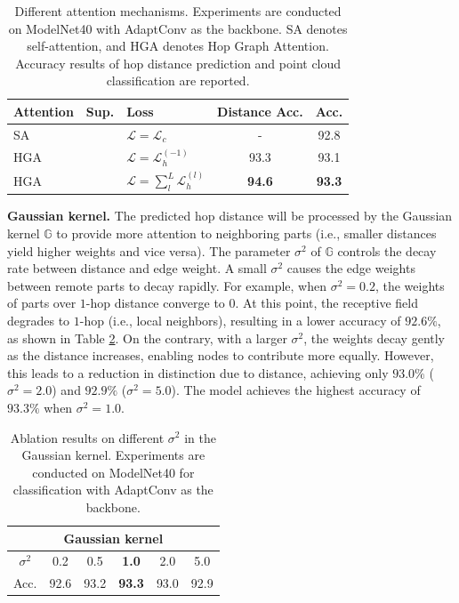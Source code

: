 \documentclass[letterpaper]{article}
\newcommand{\cmark}{\ding{51}}
\newcommand{\xmark}{\ding{55}}
\begin{document}
\setlength{\tabcolsep}{4pt}
\begin{table}
\begin{center}
\begin{tabular}{l c l c c}
\hline
Attention & Sup. & Loss & Distance Acc. & Acc.\\
\hline
SA & \cmark & $\mathcal{L} = \mathcal{L}_c $ & - & 92.8\\
HGA & \xmark & $\mathcal{L} = \mathcal{L}_h^{(-1)}$ & 93.3 & 93.1\\
HGA & \xmark & $\mathcal{L} = \sum_{l}^{L}\mathcal{L}_h^{(l)}$ & \bf{94.6} & \bf{93.3}\\
\hline
\end{tabular}
\end{center}
\caption{
Different attention mechanisms. Experiments are conducted on ModelNet40 with AdaptConv as the backbone.
SA denotes self-attention, and HGA denotes Hop Graph Attention.
Accuracy results of hop distance prediction and point cloud classification are reported.
}
\label{table:attention}
\end{table}


\textbf{Gaussian kernel.}
The predicted hop distance will be processed by the Gaussian kernel \(\mathbb{G}\) to provide more attention to neighboring parts (i.e., smaller distances yield higher weights and vice versa).
The parameter \(\sigma^2\) of \(\mathbb{G}\) controls the decay rate between distance and edge weight.
A small \(\sigma^2\) causes the edge weights between remote parts to decay rapidly.
For example, when \(\sigma^2=0.2\), the weights of parts over \(1\)-hop distance converge to $0$. At this point, the receptive field degrades to $1$-hop (i.e., local neighbors), resulting in a lower accuracy of $92.6\%$, as shown in Table \ref{table:ablation}.
On the contrary, with a larger $\sigma^2$, the weights decay gently as the distance increases, enabling nodes to contribute more equally.
However, this leads to a reduction in distinction due to distance, achieving only $93.0\%$ ($\sigma^2=2.0$) and $92.9\%$ ($\sigma^2=5.0$).
The model achieves the highest accuracy of $93.3\%$ when $\sigma^2=1.0$.


\begin{table}
\begin{center}
\begin{adjustbox}{width=0.66\columnwidth}
\begin{tabular}{c| c c c c c}
\hline
\multicolumn{6}{c}{Gaussian kernel}\\
\hline
$\sigma^2$ & 0.2 & 0.5 & \textbf{1.0} & 2.0 & 5.0\\
Acc. & 92.6 & 93.2 & \textbf{93.3} & 93.0 & 92.9 \\
\hline
\end{tabular}
\end{adjustbox}
\end{center}
\caption{Ablation results on different \(\sigma^2\) in the Gaussian kernel. Experiments are conducted on ModelNet40 for classification with AdaptConv as the backbone.}
\label{table:ablation}
\end{table}
\end{document}

